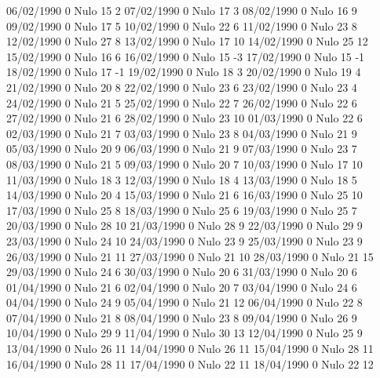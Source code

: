 06/02/1990  0     Nulo    15     2 
07/02/1990  0     Nulo    17     3 
08/02/1990  0     Nulo    16     9 
09/02/1990  0     Nulo    17     5 
10/02/1990  0     Nulo    22     6 
11/02/1990  0     Nulo    23     8 
12/02/1990  0     Nulo    27     8 
13/02/1990  0     Nulo    17     10 
14/02/1990  0     Nulo    25     12 
15/02/1990  0     Nulo    16     6 
16/02/1990  0     Nulo    15    -3 
17/02/1990  0     Nulo    15    -1 
18/02/1990  0     Nulo    17    -1 
19/02/1990  0     Nulo    18     3 
20/02/1990  0     Nulo    19     4 
21/02/1990  0     Nulo    20     8 
22/02/1990  0     Nulo    23     6 
23/02/1990  0     Nulo    23     4 
24/02/1990  0     Nulo    21     5 
25/02/1990  0     Nulo    22     7 
26/02/1990  0     Nulo    22     6 
27/02/1990  0     Nulo    21     6 
28/02/1990  0     Nulo    23     10 
01/03/1990  0     Nulo    22     6 
02/03/1990  0     Nulo    21     7 
03/03/1990  0     Nulo    23     8 
04/03/1990  0     Nulo    21     9 
05/03/1990  0     Nulo    20     9 
06/03/1990  0     Nulo    21     9 
07/03/1990  0     Nulo    23     7 
08/03/1990  0     Nulo    21     5 
09/03/1990  0     Nulo    20     7 
10/03/1990  0     Nulo    17     10 
11/03/1990  0     Nulo    18     3 
12/03/1990  0     Nulo    18     4 
13/03/1990  0     Nulo    18     5 
14/03/1990  0     Nulo    20     4 
15/03/1990  0     Nulo    21     6 
16/03/1990  0     Nulo    25     10 
17/03/1990  0     Nulo    25     8 
18/03/1990  0     Nulo    25     6 
19/03/1990  0     Nulo    25     7 
20/03/1990  0     Nulo    28     10 
21/03/1990  0     Nulo    28     9 
22/03/1990  0     Nulo    29     9 
23/03/1990  0     Nulo    24     10 
24/03/1990  0     Nulo    23     9 
25/03/1990  0     Nulo    23     9 
26/03/1990  0     Nulo    21     11 
27/03/1990  0     Nulo    21     10 
28/03/1990  0     Nulo    21     15 
29/03/1990  0     Nulo    24     6 
30/03/1990  0     Nulo    20     6 
31/03/1990  0     Nulo    20     6 
01/04/1990  0     Nulo    21     6 
02/04/1990  0     Nulo    20     7 
03/04/1990  0     Nulo    24     6 
04/04/1990  0     Nulo    24     9 
05/04/1990  0     Nulo    21     12 
06/04/1990  0     Nulo    22     8 
07/04/1990  0     Nulo    21     8 
08/04/1990  0     Nulo    23     8 
09/04/1990  0     Nulo    26     9 
10/04/1990  0     Nulo    29     9 
11/04/1990  0     Nulo    30     13 
12/04/1990  0     Nulo    25     9 
13/04/1990  0     Nulo    26     11 
14/04/1990  0     Nulo    26     11 
15/04/1990  0     Nulo    28     11 
16/04/1990  0     Nulo    28     11 
17/04/1990  0     Nulo    22     11 
18/04/1990  0     Nulo    22     12 
